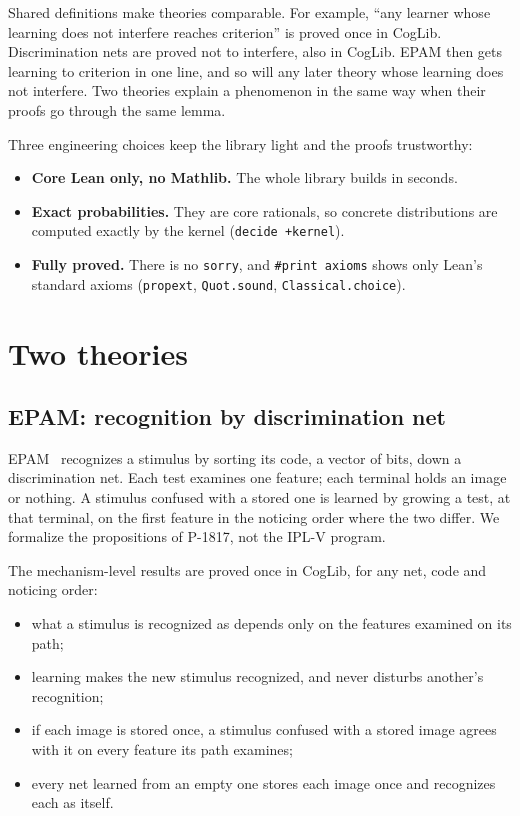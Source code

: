 \documentclass[11pt]{article}
\newcommand{\code}[1]{\texttt{#1}}
\begin{document}
Shared definitions make theories comparable. For example, ``any learner whose learning does not interfere reaches criterion'' is proved once in CogLib. Discrimination nets are proved not to interfere, also in CogLib. EPAM then gets learning to criterion in one line, and so will any later theory whose learning does not interfere. Two theories explain a phenomenon in the same way when their proofs go through the same lemma.

Three engineering choices keep the library light and the proofs trustworthy:
\begin{itemize}
  \item \textbf{Core Lean only, no Mathlib.} The whole library builds in seconds.
  \item \textbf{Exact probabilities.} They are core rationals, so concrete distributions are computed exactly by the kernel (\code{decide +kernel}).
  \item \textbf{Fully proved.} There is no \code{sorry}, and \code{\#print axioms} shows only Lean's standard axioms (\code{propext}, \code{Quot.sound}, \code{Classical.choice}).
\end{itemize}

\section{Two theories}
\label{sec:theories}

\subsection{EPAM: recognition by discrimination net}

EPAM~\cite{feigenbaum1959,feigenbaum1962} recognizes a stimulus by sorting its code, a vector of bits, down a discrimination net. Each test examines one feature; each terminal holds an image or nothing. A stimulus confused with a stored one is learned by growing a test, at that terminal, on the first feature in the noticing order where the two differ. We formalize the propositions of P-1817, not the IPL-V program.

The mechanism-level results are proved once in CogLib, for any net, code and noticing order:
\begin{itemize}
  \item what a stimulus is recognized as depends only on the features examined on its path;
  \item learning makes the new stimulus recognized, and never disturbs another's recognition;
  \item if each image is stored once, a stimulus confused with a stored image agrees with it on every feature its path examines;
  \item every net learned from an empty one stores each image once and recognizes each as itself.
\end{itemize}
\end{document}
